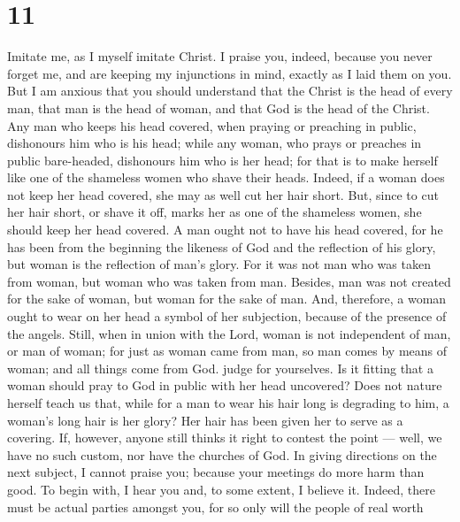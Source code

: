 \hypertarget{section-10}{%
\section{11}\label{section-10}}

 Imitate me, as I myself imitate Christ.  I
praise you, indeed, because you never forget me, and are keeping my
injunctions in mind, exactly as I laid them on you.  But I
am anxious that you should understand that the Christ is the head of
every man, that man is the head of woman, and that God is the head of
the Christ.  Any man who keeps his head covered, when
praying or preaching in public, dishonours him who is his head;
 while any woman, who prays or preaches in public
bare-headed, dishonours him who is her head; for that is to make herself
like one of the shameless women who shave their heads. 
Indeed, if a woman does not keep her head covered, she may as well cut
her hair short. But, since to cut her hair short, or shave it off, marks
her as one of the shameless women, she should keep her head covered.
 A man ought not to have his head covered, for he has been
from the beginning the likeness of God and the reflection of his glory,
but woman is the reflection of man's glory.  For it was not
man who was taken from woman, but woman who was taken from man.
 Besides, man was not created for the sake of woman, but
woman for the sake of man.  And, therefore, a woman ought
to wear on her head a symbol of her subjection, because of the presence
of the angels.  Still, when in union with the Lord, woman
is not independent of man, or man of woman;  for just as
woman came from man, so man comes by means of woman; and all things come
from God.  judge for yourselves. Is it fitting that a woman
should pray to God in public with her head uncovered?  Does
not nature herself teach us that, while for a man to wear his hair long
is degrading to him,  a woman's long hair is her glory? Her
hair has been given her to serve as a covering.  If,
however, anyone still thinks it right to contest the point --- well, we
have no such custom, nor have the churches of God.  In
giving directions on the next subject, I cannot praise you; because your
meetings do more harm than good.  To begin with, I hear you
and, to some extent, I believe it.  Indeed, there must be
actual parties amongst you, for so only will the people of real worth
